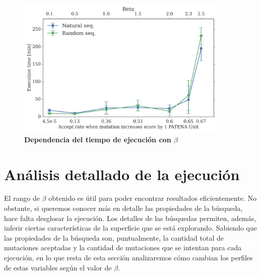 \begin{figure}[htbp]
\centering
\includegraphics[width=0.9\textwidth]{img/resultados/beta-vs-time-length50-300dpi.png}
\caption{\textbf{Dependencia del tiempo de ejecución con $\beta$}}
\label{fig:beta-vs-time}
\end{figure}















\section{Análisis detallado de la ejecución}
% 
% 



El rango de $\beta$ obtenido es útil para poder encontrar resultados eficientemente. No obstante, si queremos conocer más en detalle las propiedades de la búsqueda,
hace falta desglosar la ejecución.
Los detalles de las búsquedas permiten, además, inferir ciertas características de la superficie que se está explorando.
Sabiendo que las propiedades de la búsqueda son, puntualmente, 
la cantidad total de mutaciones aceptadas y la cantidad de mutaciones que se intentan para cada ejecución, 
en lo que resta de esta sección analizaremos cómo cambian los perfiles de estas variables según el valor de $\beta$. %
 

